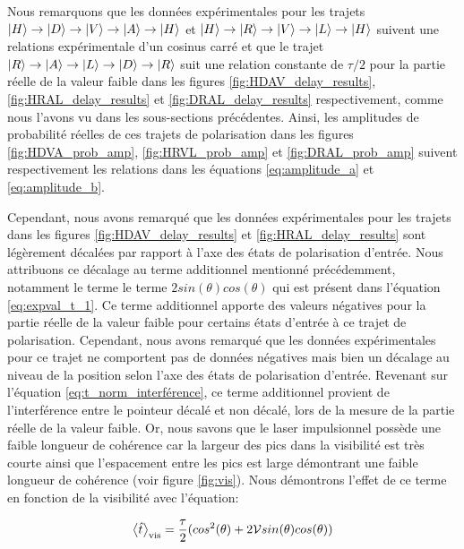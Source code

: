 \label{sec:implications_real}
\begin{onehalfspace}
    Nous remarquons que les données expérimentales pour les trajets 
    $\ket{H} \rightarrow \ket{D} \rightarrow \ket{V} \rightarrow \ket{A} \rightarrow \ket{H}$ 
    et $\ket{H} \rightarrow \ket{R} \rightarrow \ket{V} \rightarrow \ket{L} \rightarrow \ket{H}$ 
    suivent une relations expérimentale d'un cosinus carré et que le 
    trajet $\ket{R} \rightarrow \ket{A} \rightarrow \ket{L} \rightarrow \ket{D} \rightarrow \ket{R}$
    suit une relation constante de $\tau/2$ pour la partie réelle de la valeur faible
    dans les figures \ref{fig:HDAV_delay_results}, \ref{fig:HRAL_delay_results} et \ref{fig:DRAL_delay_results} respectivement, 
    comme nous l'avons vu dans les sous-sections précédentes. Ainsi, les
    amplitudes de probabilité réelles de ces trajets de polarisation
    dans les figures \ref{fig:HDVA_prob_amp}, \ref{fig:HRVL_prob_amp} et \ref{fig:DRAL_prob_amp}
    suivent respectivement les relations dans les équations
    \ref{eq:amplitude_a} et \ref{eq:amplitude_b}. 
    
    \noindent Cependant, 
    nous avons remarqué que les données expérimentales pour les trajets
    dans les figures \ref{fig:HDAV_delay_results} et \ref{fig:HRAL_delay_results}
    sont légèrement décalées par rapport à l'axe des états de polarisation
    d'entrée. Nous attribuons ce décalage au terme additionnel
    mentionné précédemment, notamment le terme le terme 
    $2sin(\theta)cos(\theta)$ qui est présent dans l'équation \ref{eq:expval_t_1}.
    Ce terme additionnel apporte des valeurs négatives pour la partie réelle de la valeur faible
    pour certains états d'entrée à ce trajet de polarisation.
    Cependant, nous avons remarqué que les données expérimentales pour ce trajet
    ne comportent pas de données négatives mais bien un décalage au niveau de 
    la position selon l'axe des états de polarisation d'entrée.
    Revenant sur l'équation \ref{eq:t_norm_interférence}, ce terme 
    additionnel provient de l'interférence entre le pointeur décalé et 
    non décalé, lors de la mesure de la partie réelle de la valeur faible.
    Or, nous savons que le laser impulsionnel possède une faible
    longueur de cohérence car la largeur des pics dans la visibilité est très courte ainsi
    que l'espacement entre les pics est large démontrant une faible longueur de cohérence (voir figure \ref{fig:vis}).
    Nous démontrons
    l'effet de ce terme en fonction de la visibilité avec l'équation:

    \begin{equation}
        \expval{\hat{t}}_{\text{vis}} = \frac{\tau}{2}(cos^2(\theta) + 2\mathcal{V} sin(\theta)cos(\theta))\label{eq:vis_eq}
    \end{equation}
    

\end{onehalfspace}
